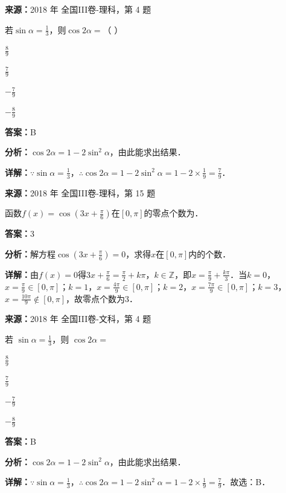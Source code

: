 \begin{question}[points=5]
\textbf{来源：}2018 年 全国III卷-理科，第 4 题\par
若$\sin\alpha=\frac{1}{3}$，则$\cos2\alpha=$（ ）
\begin{choices}
  \item $\frac{8}{9}$
  \item $\frac{7}{9}$
  \item $-\frac{7}{9}$
  \item $-\frac{8}{9}$
\end{choices}
\begin{solution}
\textbf{答案：}B

\textbf{分析：}$\cos2\alpha=1-2\sin^2\alpha$，由此能求出结果．

\textbf{详解：}$\because \sin\alpha=\frac{1}{3}$，$\therefore \cos2\alpha=1-2\sin^2\alpha=1-2\times\frac{1}{9}=\frac{7}{9}$．
\end{solution}
\end{question}

\begin{question}[points=5]
\textbf{来源：}2018 年 全国III卷-理科，第 15 题\par
函数$f(x)=\cos(3x+\frac{\pi}{6})$在$[0,\pi]$的零点个数为．
\fillin[{$3$}]
\begin{solution}
\textbf{答案：}$3$

\textbf{分析：}解方程$\cos(3x+\frac{\pi}{6})=0$，求得$x$在$[0,\pi]$内的个数．

\textbf{详解：}由$f(x)=0$得$3x+\frac{\pi}{6}=\frac{\pi}{2}+k\pi$，$k\in\mathbb{Z}$，即$x=\frac{\pi}{9}+\frac{k\pi}{3}$．当$k=0$，$x=\frac{\pi}{9}\in[0,\pi]$；$k=1$，$x=\frac{4\pi}{9}\in[0,\pi]$；$k=2$，$x=\frac{7\pi}{9}\in[0,\pi]$；$k=3$，$x=\frac{10\pi}{9}\notin[0,\pi]$，故零点个数为3．
\end{solution}
\end{question}

\begin{question}[points=5]
\textbf{来源：}2018 年 全国III卷-文科，第 4 题\par
若 $\sin\alpha = \frac{1}{3}$，则 $\cos2\alpha =$
\begin{choices}
  \item $\frac{8}{9}$
  \item $\frac{7}{9}$
  \item $-\frac{7}{9}$
  \item $-\frac{8}{9}$
\end{choices}
\begin{solution}
\textbf{答案：}B

\textbf{分析：}$\cos2\alpha=1-2\sin^2\alpha$，由此能求出结果．

\textbf{详解：}$\because \sin\alpha = \frac{1}{3}$，$\therefore \cos2\alpha = 1-2\sin^2\alpha = 1-2\times \frac{1}{9} = \frac{7}{9}$．故选：B．
\end{solution}
\end{question}

